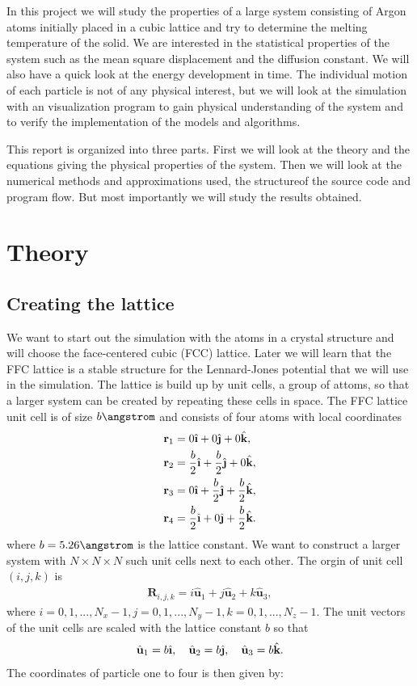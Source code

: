 \documentclass[11pt,a4wide]{article}
\renewcommand{\vec}{\mathbf}
\newcommand{\ihat}{\hat{\textbf{\i}}}
\newcommand{\jhat}{\hat{\textbf{\j}}}
\newcommand{\khat}{\hat{\textbf{k}}}
\begin{document}
In this project we will study the properties of a large system consisting of Argon atoms initially placed in a cubic lattice and try to determine the melting temperature of the solid. We are interested in the statistical properties of the system such as the mean square displacement and the diffusion constant. We will also have a quick look at the energy development in time. The individual motion of each particle is not of any physical interest, but we will look at the simulation with an visualization program to gain physical understanding of the system and to verify the implementation of the models and algorithms. 

This report is organized into three parts. First we will look at the theory and the equations giving the physical properties of the system. Then we will look at the numerical methods and approximations used, the structureof the source code and program flow. But most importantly we will study the results obtained.

\newpage
\section{Theory}

\subsection{Creating the lattice} \label{sec: creating_lattice_theory} 
We want to start out the simulation with the atoms in a crystal structure and will choose the face-centered cubic (FCC) lattice. Later we will learn that the FFC lattice is a stable structure for the Lennard-Jones potential that we will use in the simulation. The lattice is build up by unit cells, a group of attoms, so that a larger system can be created by repeating these cells in space. The FFC lattice unit cell is of size $b \angstrom $ and consists of four atoms with local coordinates
\begin{align}
	\vec r_1 &= 0 \ihat + 0 \jhat + 0 \khat,\\
	\vec r_2 &= \frac{b}{2} \ihat + \frac{b}{2} \jhat + 0 \khat,\\
	\vec r_3 &= 0 \ihat + \frac{b}{2} \jhat + \frac{b}{2} \khat,\\
	\vec r_4 &= \frac{b}{2} \ihat + 0 \jhat + \frac{b}{2} \khat.
\end{align}
where $b=5.26 \angstrom$ is the lattice constant. We want to construct a larger system with $N\times N\times N$ such unit cells next to each other. The orgin of unit cell $(i,j,k)$ is
\begin{align}
	\vec R_{i,j,k} = i \hat{\textbf{u}}_1 + j \hat{\textbf{u}}_2 + k \hat{\textbf{u}}_3,
\end{align}
where $i=0,1,..., N_x-1, j=0,1,..., N_y-1, k=0,1,..., N_z-1$. The unit vectors of the unit cells are scaled with the lattice constant $b$ so that
\begin{align}
	\hat{\textbf{u}}_1 = b\ihat, \quad \hat{\textbf{u}}_2 = b\jhat, \quad \hat{\textbf{u}}_3 = b\khat.
\end{align}
The coordinates of particle one to four is then given by:
\end{document}
